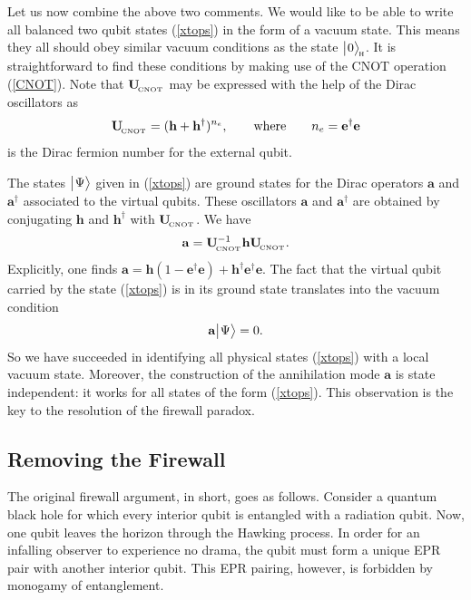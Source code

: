 \documentclass[aps,prd,twocolumn,nofootinbib,superscriptaddress,amssymb]{revtex4}
\def\be{\begin{equation}}
\def\ee{\end{equation}}
\begin{document}
Let us now combine the above two comments.
We would like to be able to write all balanced two qubit states (\ref{xtops}) in the form of a vacuum state.
This means they all should obey similar vacuum conditions as the state $\bigl|\hspace{.5pt} 0 \bigr\rangle_{\! {\mbox{\scriptsize \hspace{.5pt}\sc h}}}$. 
It is straightforward to find these conditions by making use of the
CNOT operation (\ref{CNOT}). Note that ${\bf U}_{{\! }_{\rm CNOT}}$ may be expressed with the help of the Dirac oscillators as 
\be
{\bf U}_{{\! }_{\rm CNOT}} = (\mathbf{h}+\mathbf{h}^\dagger)^{n_e},\qquad \mbox{where} \qquad n_e =  \mathbf{e}^\dagger \mathbf{e}  
\ee
is the Dirac fermion number for the external qubit. 

The states $\bigl|\hspace{.5pt} \Psi\bigr\rangle$ given in (\ref{xtops}) are ground states for the Dirac operators $\mathbf{a}$ and $\mathbf{a}^\dagger$ associated to the virtual qubits. These oscillators $\mathbf{a}$ and $\mathbf{a}^\dagger$ are obtained 
by conjugating $\mathbf{h}$ and $\mathbf{h}^\dagger$ with ${\bf U}_{{\! }_{\rm CNOT}}$. We have 
\be
\label{acnot}
\mathbf{a}={\bf U}^{-1}_{{\! }_{\rm CNOT}}\mathbf{h} {\bf U}_{{\! }_{\rm CNOT}}.
\ee
Explicitly, one finds $\mathbf{a} =  \mathbf{h}(1-\mathbf{e}^\dagger \mathbf{e})+\mathbf{h}^\dagger\mathbf{e}^\dagger \mathbf{e}$. The fact that the virtual qubit carried by the state (\ref{xtops}) is in its ground state translates into the vacuum condition
\be
\label{vaccond}
\mathbf{a}  \li \Psi\ra = 0.
\ee
So we have succeeded in identifying all physical states (\ref{xtops}) with a local vacuum state. Moreover, the construction of the annihilation mode $\mathbf{a}$ is 
state independent: it works for all states of the form (\ref{xtops}). This observation is the key to the resolution of the firewall paradox.  




\vspace{-2mm}

\subsection{Removing the Firewall}

\vspace{-2mm}



The original firewall argument, in short, goes as follows. Consider a quantum black hole for which  every interior qubit is entangled with a radiation qubit. 
Now, one qubit leaves the horizon through the Hawking process.  In order for an infalling observer to experience no drama, the qubit must form a unique EPR pair with another interior
qubit. This EPR pairing, however, is forbidden by monogamy of entanglement.
\end{document}
